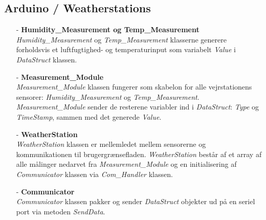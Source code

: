\subsection{Arduino / Weatherstations}
\begin{itemize}
    \item[-] \textbf{Humidity\_Measurement og Temp\_Measurement} \hfill \\
    \textit{Humidity\_Measurement} og \textit{Temp\_Measurement} klasserne generere forholdsvis et luftfugtighed- og temperaturinput som variabelt \textit{Value} i \textit{DataStruct} klassen.
    
    \item[-] \textbf{Measurement\_Module} \hfill \\
    \textit{Measurement\_Module} klassen fungerer som skabelon for alle vejrstationens sensorer: \textit{Humidity\_Measurement} og \textit{Temp\_Measurement}. \textit{Measurement\_Module} sender de resterene variabler ind i \textit{DataStruct}: \textit{Type} og \textit{TimeStamp}, sammen med det generede \textit{Value}.
    
    \item[-] \textbf{WeatherStation} \hfill \\
    \textit{WeatherStation} klassen er mellemledet mellem sensorerne og kommunikationen til brugergrænsefladen. \textit{WeatherStation} består af et array af alle målinger nedarvet fra \textit{Measurement\_Module} og en initialisering af \textit{Communicator} klassen via \textit{Com\_Handler} klassen.
    
    \item[-] \textbf{Communicator} \hfill \\
    \textit{Communicator} klassen pakker og sender \textit{DataStruct} objekter ud på en seriel port via metoden \textit{SendData}.
\end{itemize}

